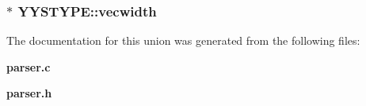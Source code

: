 \subsubsection{$\ast$ YYSTYPE::vecwidth}\label{unionYYSTYPE_m8}




The documentation for this union was generated from the following files:\begin{CompactItemize}
\item 
{\bf parser.c}\item 
{\bf parser.h}\end{CompactItemize}
